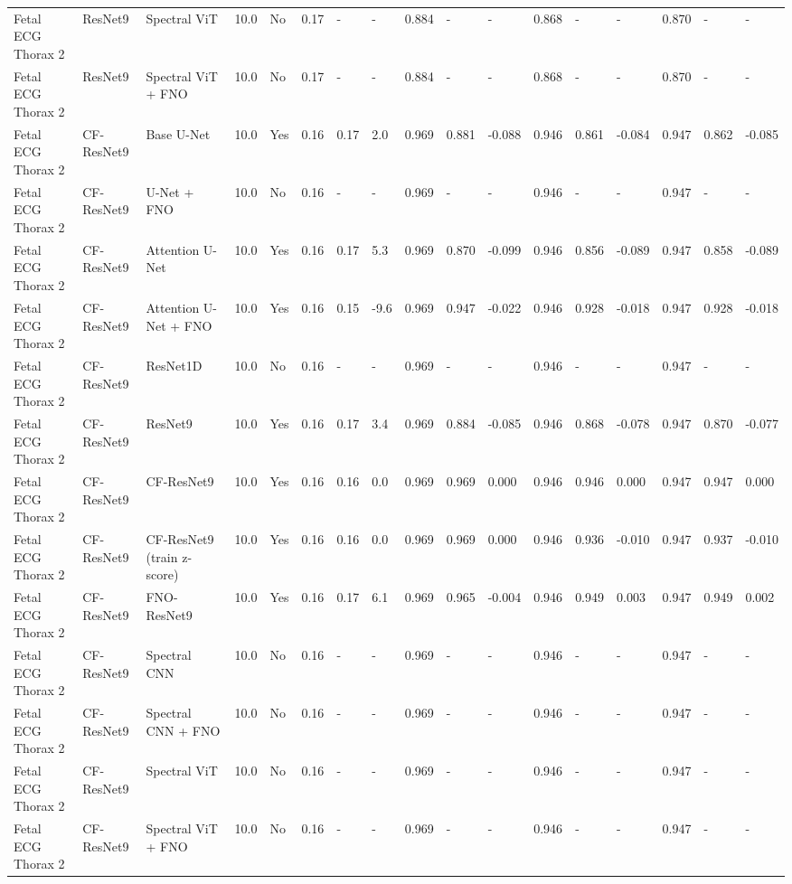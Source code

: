 \begin{longtable}{lllllllllllllllll}
Fetal ECG Thorax 2 & ResNet9 & Spectral ViT & 10.0 & No & 0.17 & - & - & 0.884 & - & - & 0.868 & - & - & 0.870 & - & - \\
Fetal ECG Thorax 2 & ResNet9 & Spectral ViT + FNO & 10.0 & No & 0.17 & - & - & 0.884 & - & - & 0.868 & - & - & 0.870 & - & - \\
Fetal ECG Thorax 2 & CF-ResNet9 & Base U-Net & 10.0 & Yes & 0.16 & 0.17 & 2.0 & 0.969 & 0.881 & -0.088 & 0.946 & 0.861 & -0.084 & 0.947 & 0.862 & -0.085 \\
Fetal ECG Thorax 2 & CF-ResNet9 & U-Net + FNO & 10.0 & No & 0.16 & - & - & 0.969 & - & - & 0.946 & - & - & 0.947 & - & - \\
Fetal ECG Thorax 2 & CF-ResNet9 & Attention U-Net & 10.0 & Yes & 0.16 & 0.17 & 5.3 & 0.969 & 0.870 & -0.099 & 0.946 & 0.856 & -0.089 & 0.947 & 0.858 & -0.089 \\
Fetal ECG Thorax 2 & CF-ResNet9 & Attention U-Net + FNO & 10.0 & Yes & 0.16 & 0.15 & -9.6 & 0.969 & 0.947 & -0.022 & 0.946 & 0.928 & -0.018 & 0.947 & 0.928 & -0.018 \\
Fetal ECG Thorax 2 & CF-ResNet9 & ResNet1D & 10.0 & No & 0.16 & - & - & 0.969 & - & - & 0.946 & - & - & 0.947 & - & - \\
Fetal ECG Thorax 2 & CF-ResNet9 & ResNet9 & 10.0 & Yes & 0.16 & 0.17 & 3.4 & 0.969 & 0.884 & -0.085 & 0.946 & 0.868 & -0.078 & 0.947 & 0.870 & -0.077 \\
Fetal ECG Thorax 2 & CF-ResNet9 & CF-ResNet9 & 10.0 & Yes & 0.16 & 0.16 & 0.0 & 0.969 & 0.969 & 0.000 & 0.946 & 0.946 & 0.000 & 0.947 & 0.947 & 0.000 \\
Fetal ECG Thorax 2 & CF-ResNet9 & CF-ResNet9 (train z-score) & 10.0 & Yes & 0.16 & 0.16 & 0.0 & 0.969 & 0.969 & 0.000 & 0.946 & 0.936 & -0.010 & 0.947 & 0.937 & -0.010 \\
Fetal ECG Thorax 2 & CF-ResNet9 & FNO-ResNet9 & 10.0 & Yes & 0.16 & 0.17 & 6.1 & 0.969 & 0.965 & -0.004 & 0.946 & 0.949 & 0.003 & 0.947 & 0.949 & 0.002 \\
Fetal ECG Thorax 2 & CF-ResNet9 & Spectral CNN & 10.0 & No & 0.16 & - & - & 0.969 & - & - & 0.946 & - & - & 0.947 & - & - \\
Fetal ECG Thorax 2 & CF-ResNet9 & Spectral CNN + FNO & 10.0 & No & 0.16 & - & - & 0.969 & - & - & 0.946 & - & - & 0.947 & - & - \\
Fetal ECG Thorax 2 & CF-ResNet9 & Spectral ViT & 10.0 & No & 0.16 & - & - & 0.969 & - & - & 0.946 & - & - & 0.947 & - & - \\
Fetal ECG Thorax 2 & CF-ResNet9 & Spectral ViT + FNO & 10.0 & No & 0.16 & - & - & 0.969 & - & - & 0.946 & - & - & 0.947 & - & - \\

\end{longtable}
